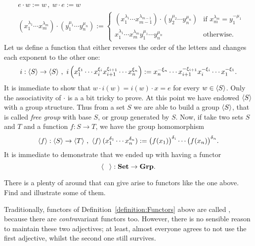 \begin{example}
\[\begin{aligned}
& e \cdot w := w \,, \ w \cdot e := w \\
& (x_1^{\lambda_1} \cdots{} x_m^{\lambda_m}) \cdot (y_1^{\mu_1} \cdots{} y_n^{\mu_n}) :=
\begin{cases} (x_1^{\lambda_1} \cdots{} x_{m-1}^{\lambda_{m-1}}) \cdot (y_2^{\mu_2} \cdots{} y_n^{\mu_n}) & \text{if } x_{m}^{\lambda_m} = y_1^{-\mu_1} \\ x_1^{\lambda_1} \cdots{} x_m^{\lambda_m} y_1^{\mu_1} \cdots{} y_n^{\mu_n} & \text{otherwise.} \end{cases}
\end{aligned}\]
Let us define a function that either reverses the order of the letters and changes each exponent to the other one:
\[i : \left\langle S\right\rangle \to \left\langle S\right\rangle \,, \ i\left( x_1^{\xi_1} \cdots{} x_i^{\xi_i} x_{i+1}^{\xi_{i+1}} \cdots{} x_n^{\xi_n} \right) := x_n^{-\xi_n} \cdots{} x_{i+1}^{-\xi_{i+1}} x_i^{-\xi_i} \cdots{} x_1^{-\xi_1} .\]
It is immediate to show that \(w \cdot i(w) = i(w) \cdot x = e\) for every \(w \in \left\langle S\right\rangle\). Only the associativity of \(\cdot\) is a a bit tricky to prove. At this point we have endowed \(\left\langle S\right\rangle\) with a group structure.\newline
Thus from a set \(S\) we are able to build a group \(\left\langle S\right\rangle\), that is called {\em free group} with base \(S\), or group generated by \(S\). Now, if take two sets \(S\) and \(T\) and a function \(f : S \to T\), we have the group homomorphism
\[\left\langle f\right\rangle : \left\langle S\right\rangle \to \left\langle T\right\rangle \,, \ \left\langle f\right\rangle (x_1^{\delta_1} \cdots{} x_n^{\delta_n}) := \big(f(x_1)\big)^{\delta_i} \cdots{} \big(f(x_n)\big)^{\delta_n} .\]
It is immediate to demonstrate that we ended up with having a functor
\[\angled{\phantom\square} : \Set \to \Grp .\]
\end{example}

\begin{exercise}
There is a plenty of  around that can give arise to functors like the one above. Find and illustrate some of them.
\end{exercise}

Traditionally, functors of Definition~\ref{definition:Functors} above are called , because there are {\em contra}variant functors too. However, there is no sensible reason to maintain these two adjectives; at least, almost everyone agrees to not use the first adjective, whilst the second one still survives.

